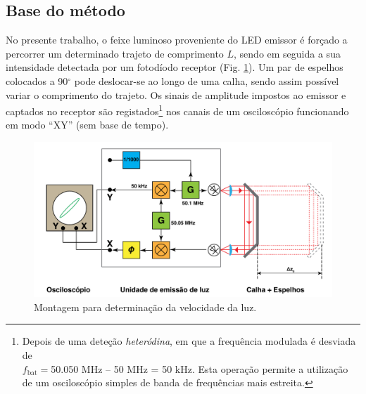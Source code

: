 \documentclass[12pt,a4paper,oneside]{paper}
\begin{document}

\newpage
\subsection{\sf Base do método}
No presente trabalho, o feixe luminoso proveniente do LED emissor é forçado a percorrer um determinado trajeto de comprimento $L$, sendo em seguida a sua intensidade  detectada por um fotodíodo receptor (Fig. \ref{fig:Montagem}). Um par de espelhos colocados a 90$^\circ$ pode deslocar-se ao longo de uma calha, sendo assim possível variar o comprimento do trajeto. Os sinais de amplitude impostos ao emissor e captados no receptor são registados\footnote{Depois de uma deteção \emph{heteródina}, em que a frequência modulada é desviada de \\ 
$f_{\textrm{bat}}=$50.050 MHz -- 50 MHz  = 50 kHz. Esta operação permite a utilização de um osciloscópio simples de banda de frequências mais estreita.} 
nos canais de um osciloscópio funcionando em modo “XY” (sem base de tempo).

\begin{figure}[H] 
 \centering 
	\includegraphics[width=01.0\textwidth]{./luz_images/esquema.pdf}
	\caption{Montagem para determinação da velocidade da luz. \label{fig:Montagem}} 
\end{figure}
\end{document}
